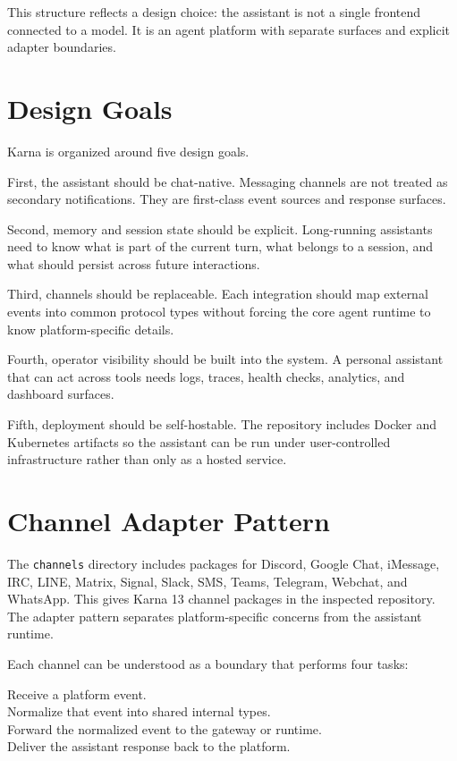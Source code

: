 \documentclass[11pt]{article}
\begin{document}
This structure reflects a design choice: the assistant is not a single frontend connected to a model. It is an agent platform with separate surfaces and explicit adapter boundaries.

\section{Design Goals}

Karna is organized around five design goals.

First, the assistant should be chat-native. Messaging channels are not treated as secondary notifications. They are first-class event sources and response surfaces.

Second, memory and session state should be explicit. Long-running assistants need to know what is part of the current turn, what belongs to a session, and what should persist across future interactions.

Third, channels should be replaceable. Each integration should map external events into common protocol types without forcing the core agent runtime to know platform-specific details.

Fourth, operator visibility should be built into the system. A personal assistant that can act across tools needs logs, traces, health checks, analytics, and dashboard surfaces.

Fifth, deployment should be self-hostable. The repository includes Docker and Kubernetes artifacts so the assistant can be run under user-controlled infrastructure rather than only as a hosted service.

\section{Channel Adapter Pattern}

The \texttt{channels} directory includes packages for Discord, Google Chat, iMessage, IRC, LINE, Matrix, Signal, Slack, SMS, Teams, Telegram, Webchat, and WhatsApp. This gives Karna 13 channel packages in the inspected repository. The adapter pattern separates platform-specific concerns from the assistant runtime.

Each channel can be understood as a boundary that performs four tasks:

\noindent Receive a platform event.\\
\noindent Normalize that event into shared internal types.\\
\noindent Forward the normalized event to the gateway or runtime.\\
\noindent Deliver the assistant response back to the platform.\\
\end{document}
